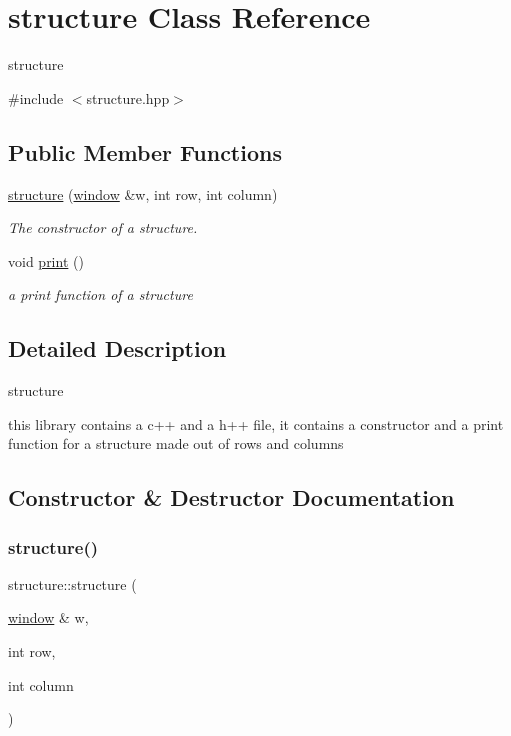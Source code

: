 \hypertarget{classstructure}{}\section{structure Class Reference}
\label{classstructure}


structure  




{\ttfamily \#include $<$structure.\+hpp$>$}

\subsection*{Public Member Functions}
\begin{DoxyCompactItemize}
\item 
\hyperlink{classstructure_a0ed33e802c75a39ae0ea4f32591801d6}{structure} (\hyperlink{classwindow}{window} \&w, int row, int column)
\begin{DoxyCompactList}\small\item\em The constructor of a structure. \end{DoxyCompactList}\item 
void \hyperlink{classstructure_a0ea72a58f3ccac0a64a0f9b676c1776c}{print} ()
\begin{DoxyCompactList}\small\item\em a print function of a structure \end{DoxyCompactList}\end{DoxyCompactItemize}


\subsection{Detailed Description}
structure 

this library contains a c++ and a h++ file, it contains a constructor and a print function for a structure made out of rows and columns 

\subsection{Constructor \& Destructor Documentation}
\mbox{\label{classstructure_a0ed33e802c75a39ae0ea4f32591801d6}} 
\subsubsection{\texorpdfstring{structure()}{structure()}}
{\footnotesize\ttfamily structure\+::structure (\begin{DoxyParamCaption}\item[{\hyperlink{classwindow}{window} \&}]{w,  }\item[{int}]{row,  }\item[{int}]{column }\end{DoxyParamCaption})\hspace{0.3cm}{\ttfamily [inline]}}




